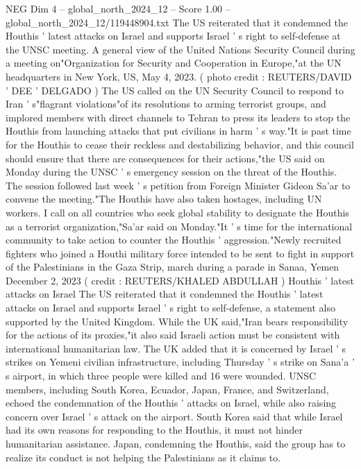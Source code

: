\begin{textsample}{NEG Dim 4 – global\_north\_2024\_12 – Score 1.00 – global\_north\_2024\_12/119448904.txt}  \label{ex:f4_neg_156}
The US reiterated that it condemned the Houthis ' latest attacks on Israel and supports Israel ' s right to self-defense at the UNSC meeting.
A general view of the United Nations Security Council during a meeting on"Organization for Security and Cooperation in Europe,"at the UN headquarters in New York, US, May 4, 2023. ( photo credit : REUTERS/DAVID ' DEE ' DELGADO ) The US called on the UN Security Council to respond to Iran ' s"flagrant violations"of its resolutions to arming terrorist groups, and implored members with direct channels to Tehran to press its leaders to stop the Houthis from launching attacks that put civilians in harm ' s way."It is past time for the Houthis to cease their reckless and destabilizing behavior, and this council should ensure that there are consequences for their actions,"the US said on Monday during the UNSC ' s emergency session on the threat of the Houthis.
The session followed last week ' s petition from Foreign Minister Gideon Sa'ar to convene the meeting."The Houthis have also taken hostages, including UN workers.
I call on all countries who seek global stability to designate the Houthis as a terrorist organization,"Sa'ar said on Monday."It ' s time for the international community to take action to counter the Houthis ' aggression."Newly recruited fighters who joined a Houthi military force intended to be sent to fight in support of the Palestinians in the Gaza Strip, march during a parade in Sanaa, Yemen December 2, 2023 ( credit : REUTERS/KHALED ABDULLAH ) Houthis ' latest attacks on Israel The US reiterated that it condemned the Houthis ' latest attacks on Israel and supports Israel ' s right to self-defense, a statement also supported by the United Kingdom.
While the UK said,"Iran bears responsibility for the actions of its proxies,"it also said Israeli action must be consistent with international humanitarian law.
The UK added that it is concerned by Israel ' s strikes on Yemeni civilian infrastructure, including Thursday ' s strike on Sana'a ' s airport, in which three people were killed and 16 were wounded.
UNSC members, including South Korea, Ecuador, Japan, France, and Switzerland, echoed the condemnation of the Houthis ' attacks on Israel, while also raising concern over Israel ' s attack on the airport.
South Korea said that while Israel had its own reasons for responding to the Houthis, it must not hinder humanitarian assistance.
Japan, condemning the Houthis, said the group has to realize its conduct is not helping the Palestinians as it claims to.

\end{textsample}
